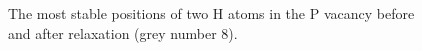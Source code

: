 \begin{figure}[h!]
\begin{minipage}[h]{0.5\linewidth}
\end{minipage}
\hfill
\begin{minipage}[h]{0.5\linewidth}
\end{minipage}
\caption{The most stable positions of two H atoms in the P vacancy before and after relaxation (grey number 8).}
\label{O2Finitialfinal}
\end{figure}

